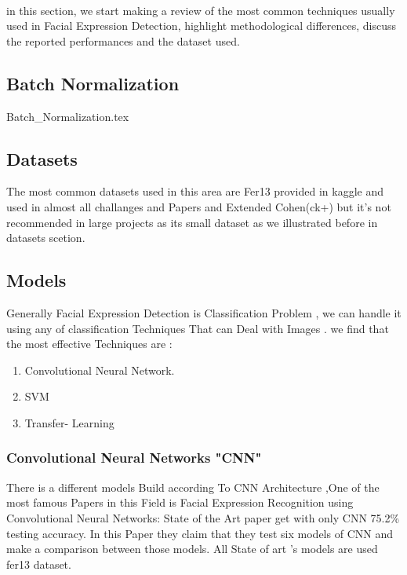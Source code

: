 \paragraph{}
in this section, we start making a review of the most common techniques usually used in Facial Expression Detection, highlight methodological differences, discuss the reported performances and the dataset used. \newline
\subsection{Batch Normalization}
{Batch_Normalization.tex}
\subsection{Datasets}
The most common datasets used in this area are Fer13 \label{fer_13} provided in kaggle and used in almost all challanges and Papers and Extended Cohen(ck+)\label{ck+} but it's not recommended in large projects as its small dataset as we illustrated before in datasets scetion.

\subsection{Models}
Generally Facial Expression Detection is Classification Problem , we can handle it using any of classification 
Techniques That can Deal with Images . we find that the most effective Techniques are :
\begin{enumerate}
	\item Convolutional Neural Network.
	\item SVM
	\item Transfer- Learning
\end{enumerate}
\subsubsection{Convolutional Neural Networks "CNN"}
There is a different models Build according To CNN Architecture ,One of the most famous Papers in this Field is Facial Expression Recognition using Convolutional Neural Networks: State of the Art paper\cite{state_of_art} get with only CNN 75.2\% testing accuracy. In this Paper they claim that they test six models of CNN and make a comparison between those models. All State of art 's models are used fer13 dataset.
